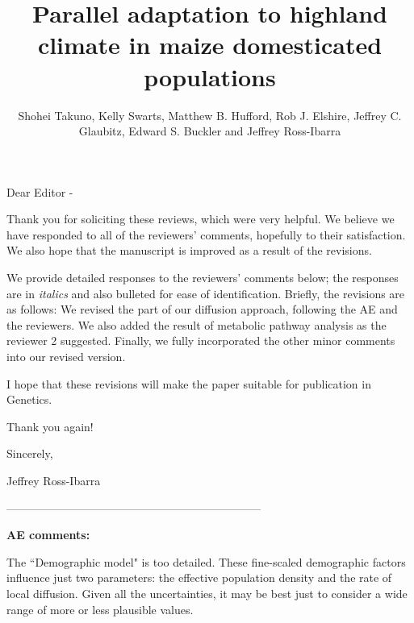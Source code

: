 \documentclass[onecolumn,oneside,letterpaper]{article}
\title{Parallel adaptation to highland climate in maize domesticated populations}
\author{
 Shohei Takuno, Kelly Swarts, Matthew B. Hufford, Rob J. Elshire, Jeffrey C. Glaubitz, Edward S. Buckler and Jeffrey Ross-Ibarra
   }
\begin{document}
\maketitle
Dear Editor - 

Thank you for soliciting these reviews, which were very helpful.   We believe we have responded to all of the reviewers' comments, hopefully to their satisfaction.  We also hope that the manuscript is improved as a result of the revisions.  

We provide detailed responses to the reviewers' comments below; the responses are in \textit{italics} and also bulleted for ease of identification.  
Briefly, the revisions are as follows:  
We revised the part of our diffusion approach, following the AE and the reviewers.  We also added the result of metabolic pathway analysis as the reviewer 2 suggested.  Finally, we fully incorporated the other minor comments into our revised version.  

I hope that these revisions will make the paper suitable for publication in Genetics. 

Thank you again! 

Sincerely, 

Jeffrey Ross-Ibarra

--------------------------------------------------------------------


\textbf{AE comments:}

The ``Demographic model" is too detailed.  These fine-scaled demographic factors influence just two parameters: 
the effective population density and the rate of local diffusion.  
Given all the uncertainties, it may be best just to consider a wide range of more or less plausible values. 
\end{document}
